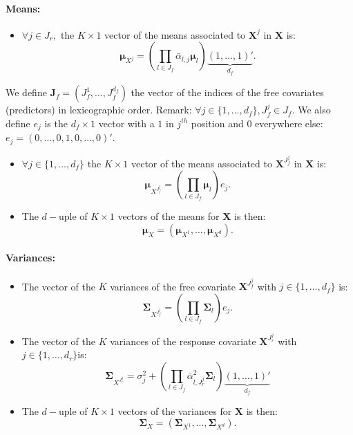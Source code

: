 \documentclass[12pt,a4paper]{report}
\begin{document}
\paragraph{Means:}
\begin{itemize} 
\item $\forall j \in J_r,$ the $K \times 1$ vector of the means associated to $\boldsymbol{X}^j$ in $\boldsymbol{X}$ is:
	\begin{equation}
		\boldsymbol{\mu}_{X^{j}}=(\prod_{l \in J_f}\bar{\alpha}_{l,j}\boldsymbol{\mu}_l)\underbrace{(1,\dots,1)'}_{d_f} .\label{meangauche}
	\end{equation}
\end{itemize}
We define $\boldsymbol{J}_f=(J_f^1,\dots,J_f^{d_f}) $ the vector of the indices of the free covariates (predictors) in lexicographic order. Remark: $\forall j \in \{1,\dots,d_f\}, J_f^j \in J_f$. We also define $e_j$ is the $d_f \times 1$ vector with a $1$ in $j^{th}$ position and $0$ everywhere else: 
\mbox{$e_j=(0,\dots,0,1,0,\dots,0)'$}.
\begin{itemize}
	\item $\forall j \in \{1,\dots,d_f\}$ the $K \times 1$ vector of the means associated to $\boldsymbol{X}^{J_f^j}$ in $\boldsymbol{X}$ is:
	\begin{equation}
		\boldsymbol{\mu}_{X^{J_f^j}}=(\prod_{l \in J_f}\boldsymbol{\mu}_l)e_j .\label{meandroite}
	\end{equation} 
	\item The $d-$uple of $K\times 1$ vectors of the means for $\boldsymbol{X}$ is then:
		\begin{equation}
			\boldsymbol{\mu}_X=(\boldsymbol{\mu}_{X^1},\dots,\boldsymbol{\mu}_{X^d}).  \nonumber 
		\end{equation}
\end{itemize}
\paragraph{Variances:}
\begin{itemize}
	\item The vector of the $K$ variances of the free covariate $\boldsymbol{X}^{J_f^j}$ with $j \in \{1,\dots,d_f \}$ is:
		\begin{equation}
			\boldsymbol{\Sigma}_{X^{J_f^j}}=(\prod_{l \in J_f}\boldsymbol{\Sigma}_l)e_j. \nonumber 
		\end{equation}
	\item The vector of the $K$ variances of the response covariate $\boldsymbol{X}^{J_r^j}$ with $j \in \{1,\dots,d_r \} $is:
	\begin{equation}
		\boldsymbol{\Sigma}_{X^{J_r^j}}=\sigma_j^2+(\prod_{l \in J_f}\bar{\alpha}_{l,J_r^j}^2\boldsymbol{\Sigma}_l)\underbrace{(1,\dots,1)'}_{d_f}  \nonumber 
	\end{equation}
	\item The $d-$uple of $K\times 1$ vectors of the variances for $\boldsymbol{X}$ is then:
		\begin{equation}
			\boldsymbol{\Sigma}_X=(\boldsymbol{\Sigma}_{X^1},\dots,\boldsymbol{\Sigma}_{X^d}). \nonumber 
		\end{equation}	
\end{itemize}
\end{document}
